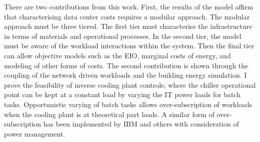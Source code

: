 There are two contributions from this work. First, the results of the model affirm that characterising data center costs requires a modular approach. The modular approach must be three tiered. The first tier must characterise the infrastructure in terms of materials and operational processes. In the second tier, the model must be aware of the workload interactions within the system. Then the final tier can allow objective models such as the EIO, marginal costs of energy, and modeling of other forms of costs. The second contribution is shown through the coupling of the network driven workloads and the building energy simulation. I prove the feasibility of inverse cooling plant controls; where the chiller operational point can be kept at a constant load by varying the IT power loads for batch tasks. Opportunistic varying of batch tasks allows over-subscription of workloads when the cooling plant is at theoretical part loads. A similar form of over-subscription has been implemented by IBM and others with consideration of power management.


 
